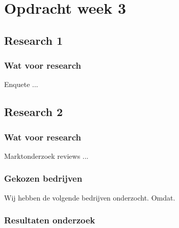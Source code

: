 \chapter{Opdracht week 3}

\section{Research 1}

\subsection{Wat voor research}

Enquete ...

\section{Research 2}

\subsection{Wat voor research}

Marktonderzoek reviews ...

\subsection{Gekozen bedrijven}

Wij hebben de volgende bedrijven onderzocht. Omdat.

\subsection{Resultaten onderzoek}
